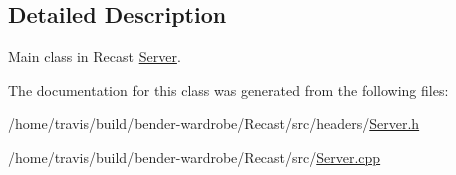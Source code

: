 \subsection{Detailed Description}
Main class in Recast \hyperlink{class_server}{Server}. 

The documentation for this class was generated from the following files\-:\begin{DoxyCompactItemize}
\item 
/home/travis/build/bender-\/wardrobe/\-Recast/src/headers/\hyperlink{_server_8h}{Server.\-h}\item 
/home/travis/build/bender-\/wardrobe/\-Recast/src/\hyperlink{_server_8cpp}{Server.\-cpp}\end{DoxyCompactItemize}
